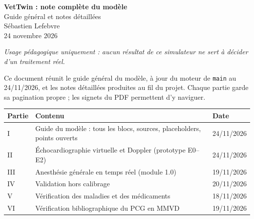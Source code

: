 \documentclass[11pt,a4paper]{article}
\newcommand{\D}{.}
\begin{document}
\begin{center}
{\LARGE\bfseries VetTwin : note complète du modèle}\\[0.6em]
{\large Guide général et notes détaillées}\\[0.6em]
{\large Sébastien Lefebvre}\\[0.6em]
24 novembre 2026
\end{center}
\vspace{1.5em}
\emph{Usage pédagogique uniquement : aucun résultat de ce simulateur ne sert à décider d'un traitement réel.}

\vspace{1em}
Ce document réunit le guide général du modèle, à jour du moteur de \texttt{main} au 24/11/2026, et les notes
détaillées produites au fil du projet. Chaque partie garde sa pagination propre ; les signets du PDF permettent d'y
naviguer.

\vspace{1em}
\begin{tabularx}{\linewidth}{@{}lXl@{}}
\toprule
Partie & Contenu & Date\\\midrule
I & Guide du modèle : tous les blocs, sources, placeholders, points ouverts & 24/11/2026\\
II & Échocardiographie virtuelle et Doppler (prototype E0--E2) & 24/11/2026\\
III & Anesthésie générale en temps réel (module 1.0) & 19/11/2026\\
IV & Validation hors calibrage & 20/11/2026\\
V & Vérification des maladies et des médicaments & 18/11/2026\\
VI & Vérification bibliographique du PCG en MMVD & 19/11/2026\\
\bottomrule
\end{tabularx}

\clearpage






\end{document}
